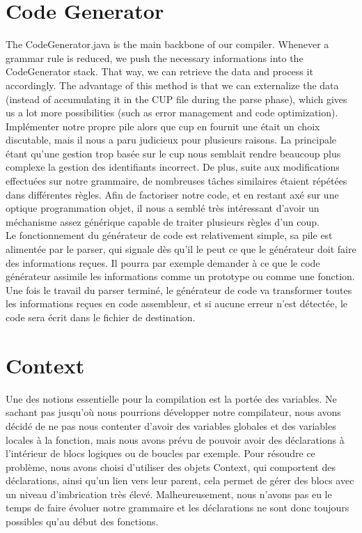 \documentclass{article}
\begin{document}
\section{Code Generator}
The CodeGenerator.java is the main backbone of our compiler. Whenever a grammar rule is reduced, we push the necessary informations into the CodeGenerator stack. That way, we can retrieve the data and process it accordingly. The advantage of this method is that we can externalize the data (instead of accumulating it in the CUP file during the parse phase), which gives us a lot more possibilities (such as error management and code optimization).\\
Implémenter notre propre pile alors que cup en fournit une était un choix discutable, mais il nous a paru judicieux pour plusieurs raisons. La principale étant qu'une gestion trop basée sur le cup nous semblait rendre beaucoup plus complexe la gestion des identifiants incorrect. De plus, suite aux modifications effectuées sur notre grammaire, de nombreuses tâches similaires étaient répétées dans différentes règles. Afin de factoriser notre code, et en restant axé sur une optique programmation objet, il nous a semblé très intéressant d'avoir un méchanisme assez générique capable de traiter plusieurs règles d'un coup.\\
Le fonctionnement du générateur de code est relativement simple, sa pile est alimentée par le parser, qui signale dès qu'il le peut ce que le générateur doit faire des informations reçues. Il pourra par exemple demander à ce que le code générateur assimile les informations comme un prototype ou comme une fonction. Une fois le travail du parser terminé, le générateur de code va transformer toutes les informations reçues en code assembleur, et si aucune erreur n'est détectée, le code sera écrit dans le fichier de destination.

\section{Context}
Une des notions essentielle pour la compilation est la portée des variables. Ne sachant pas jusqu'où nous pourrions développer notre compilateur, nous avons décidé de ne pas nous contenter d'avoir des variables globales et des variables locales à la fonction, mais nous avons prévu de pouvoir avoir des déclarations à l'intérieur de blocs logiques ou de boucles par exemple. Pour résoudre ce problème, nous avons choisi d'utiliser des objets Context, qui comportent des déclarations, ainsi qu'un lien vers leur parent, cela permet de gérer des blocs avec un niveau d'imbrication très élevé. Malheureusement, nous n'avons pas eu le temps de faire évoluer notre grammaire et les déclarations ne sont donc toujours possibles qu'au début des fonctions.
\end{document}
